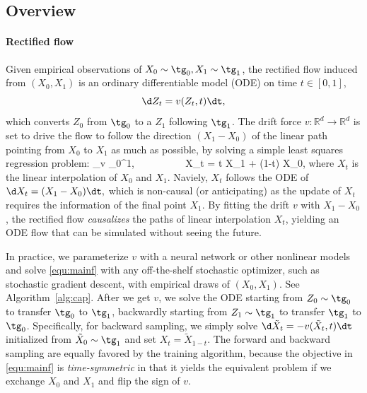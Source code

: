 \documentclass[11pt]{article}
\newcommand{\E}{\mathbb{E}}
\newcommand{\RR}{\mathbb{R}}
\newcommand{\norm}[1]{\left\|#1\right\|}
\begin{document}
\subsection{Overview}%
\label{sec:firstintro}

\paragraph{Rectified flow}
Given empirical observations of $X_0\sim \tg_0, X_1\sim \tg_1$, 
the rectified flow induced from $(X_0,X_1)$ 
is an ordinary differentiable model (ODE)
on time $t\in[0,1]$, 
$$
\d Z_t = v(Z_t, t) \dt, 
$$
which converts $Z_0$ from $\tg_0$ to a $Z_1$ following $\tg_1$. 
The drift force 
 $v\colon \RR^d\to \RR^d$  is set to drive the flow to 
 follow the direction $(X_1-X_0)$ 
 of the linear path pointing from $X_0$ to $X_1$
 as much as possible, by solving a simple 
 least squares regression problem:  \bbb\label{equ:mainf}
\min_{v} %
\int_0^1\E \left [ \norm{( X_1 - X_0) - v\big (X_t,~ t\big)}^2
\right ] \dt, 
~~~~~~~~~
X_t = t X_1 + (1-t) X_0, 
\eee 
where $X_t$ is 
the linear interpolation  of  $X_0$ and  $X_1$. 
Naviely, $X_t$ follows the ODE of $\d  X_t =(X_1-X_0)\dt,$ which is non-causal (or anticipating) as the update of $X_t$ requires the information of the final point $X_1$.  
By fitting the drift $v$ with $X_1-X_0$, 
the rectified flow \emph{causalizes}
the paths of linear interpolation $X_t$, 
yielding an ODE flow %
that can be simulated without seeing the future. %


 In practice, we parameterize $v$ with a neural network or other nonlinear models 
 and solve  
  \eqref{equ:mainf} %
  with any  off-the-shelf stochastic optimizer, such as stochastic gradient descent,  
  with empirical draws of $(X_0,X_1)$. See 
  Algorithm~\ref{alg:cap}. 
  After we get $v$, we solve the ODE starting from $Z_0 \sim \tg_0$ to transfer $\tg_0$ to $\tg_1$,
   backwardly starting from $Z_1\sim \tg_1$ to transfer $\tg_1$ to $\tg_0$. Specifically, 
  for  backward sampling, 
  we simply  
  solve $\d \tilde X_t = -v(\tilde X_t, t) \dt $ initialized from $\tilde X_0 \sim \tg_1$ and set 
   $X_t= \tilde X_{1-t}$. 
   The forward and backward sampling 
are equally favored by the training  algorithm, because  the objective  in \eqref{equ:mainf} is 
\emph{time-symmetric} 
in that it yields the equivalent problem if we exchange $X_0$ and $X_1$ and flip the sign of $v$. 



 
\end{document}
